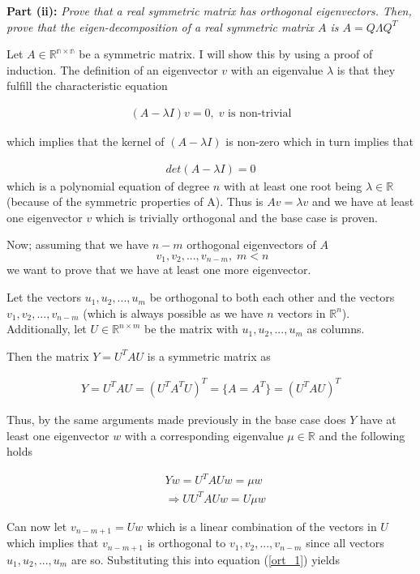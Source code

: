 \textbf{Part (ii):} \textit{Prove that a real symmetric matrix has orthogonal eigenvectors. Then, prove that the eigen-decomposition of a real symmetric matrix $A$ is $A = Q\Lambda Q^T$}

Let $A \in \mathbb{R^{n \times n}}$ be a symmetric matrix. I will show this by using a proof of induction. The definition of an eigenvector $v$ with an eigenvalue $\lambda$ is that they fulfill the characteristic equation

\begin{align*}
  (A-\lambda I)v = 0, \; v \text{ is non-trivial}
\end{align*}

which implies that the kernel of $(A-\lambda I)$ is non-zero which in turn implies that

\begin{align*}
  det(A-\lambda I) = 0
\end{align*}
which is a polynomial equation of degree $n$ with at least one root being $\lambda \in \mathbb{R}$ (because of the symmetric properties of A). Thus is $Av = \lambda v$ and we have at least one eigenvector $v$ which is trivially orthogonal and the base case is proven.

Now; assuming that we have $n-m$ orthogonal eigenvectors of $A$
$$ \; v_1, v_2, ..., v_{n-m}, \; m < n$$
we want to prove that we have at least one more eigenvector.

Let the vectors $u_1, u_2, ..., u_m$ be orthogonal to both each other and the vectors $v_1, v_2, ..., v_{n-m}$ (which is always possible as we have $n$ vectors in $\mathbb{R}^n$). Additionally, let $U \in \mathbb{R}^{n \times m}$ be the matrix with $u_1, u_2, ..., u_m$ as columns.

Then the matrix $Y = U^T A U$ is a symmetric matrix as

\begin{align*}
  Y = U^T A U = (U^T A^T U)^T = \bigg \{ A = A^T \bigg \} = (U^T A U)^T
\end{align*}

Thus, by the same arguments made previously in the base case does $Y$ have at least one eigenvector $w$ with a corresponding eigenvalue $\mu \in \mathbb{R}$ and the following holds

\begin{align}
  & Yw = U^T A Uw = \mu w \\
  & \Rightarrow U U^T A Uw = U \mu w
  \label{ort_1}
\end{align}

Can now let $v_{n-m+1} = Uw$ which is a linear combination of the vectors in $U$ which implies that $v_{n-m+1}$ is orthogonal to $v_1, v_2, ..., v_{n-m}$ since all vectors $u_1, u_2, ..., u_m$ are so. Substituting this into equation (\ref{ort_1}) yields

